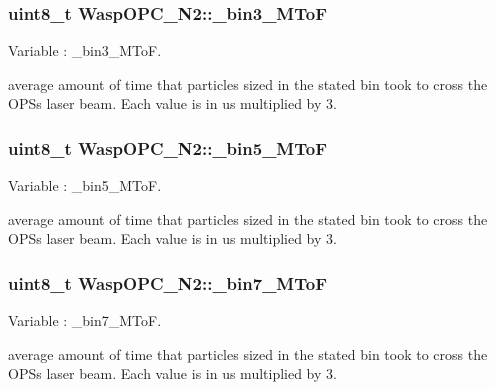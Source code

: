 \subsubsection[{\texorpdfstring{\+\_\+bin3\+\_\+\+M\+ToF}{_bin3_MToF}}]{\setlength{\rightskip}{0pt plus 5cm}uint8\+\_\+t Wasp\+O\+P\+C\+\_\+\+N2\+::\+\_\+bin3\+\_\+\+M\+ToF}\hypertarget{class_wasp_o_p_c___n2_a308f3f4e70570095d070c971f37a3427}{}\label{class_wasp_o_p_c___n2_a308f3f4e70570095d070c971f37a3427}


Variable \+: \+\_\+bin3\+\_\+\+M\+ToF. 

average amount of time that particles sized in the stated bin took to cross the O\+PS\textquotesingle{}s laser beam. Each value is in us multiplied by 3. 
\subsubsection[{\texorpdfstring{\+\_\+bin5\+\_\+\+M\+ToF}{_bin5_MToF}}]{\setlength{\rightskip}{0pt plus 5cm}uint8\+\_\+t Wasp\+O\+P\+C\+\_\+\+N2\+::\+\_\+bin5\+\_\+\+M\+ToF}\hypertarget{class_wasp_o_p_c___n2_a244d0de94d842fb2b9f351968b096c53}{}\label{class_wasp_o_p_c___n2_a244d0de94d842fb2b9f351968b096c53}


Variable \+: \+\_\+bin5\+\_\+\+M\+ToF. 

average amount of time that particles sized in the stated bin took to cross the O\+PS\textquotesingle{}s laser beam. Each value is in us multiplied by 3. 
\subsubsection[{\texorpdfstring{\+\_\+bin7\+\_\+\+M\+ToF}{_bin7_MToF}}]{\setlength{\rightskip}{0pt plus 5cm}uint8\+\_\+t Wasp\+O\+P\+C\+\_\+\+N2\+::\+\_\+bin7\+\_\+\+M\+ToF}\hypertarget{class_wasp_o_p_c___n2_a23fdf0a61206d2e29494633c095651ed}{}\label{class_wasp_o_p_c___n2_a23fdf0a61206d2e29494633c095651ed}


Variable \+: \+\_\+bin7\+\_\+\+M\+ToF. 

average amount of time that particles sized in the stated bin took to cross the O\+PS\textquotesingle{}s laser beam. Each value is in us multiplied by 3. 
